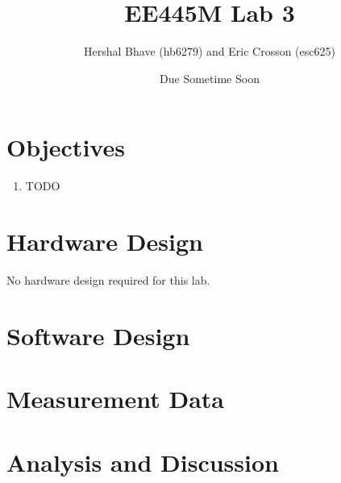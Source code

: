 \documentclass[12pt]{article}
\title{EE445M Lab 3}
\author{Hershal Bhave (hb6279) and Eric Crosson (esc625)}
\date{Due Sometime Soon}
\begin{document}
\maketitle

\section{Objectives}
\begin{enumerate}
\item \hfill {\huge \color{red} TODO}
\end{enumerate}

\section{Hardware Design}
No hardware design required for this lab.

\section{Software Design}
\section{Measurement Data}
\section{Analysis and Discussion}

\end{document}
